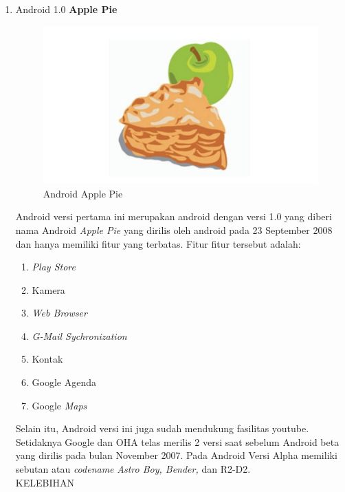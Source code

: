 \begin{enumerate}

\item Android 1.0 \textbf{Apple Pie}\\
\begin{figure}[!htbp]
    \centering
    \includegraphics[scale = 0.3]{pictures/android-apple-pie.jpg}
    \caption{Android Apple Pie}
    \label{}
\end{figure}

Android versi pertama ini merupakan android dengan versi 1.0 yang diberi nama Android \textit{Apple Pie} yang dirilis oleh android  pada 23 September 2008 dan hanya memiliki fitur yang terbatas. Fitur fitur tersebut adalah:

\begin{enumerate}
    \item \textit{Play Store}
    \item Kamera
    \item \textit{Web Browser}
    \item \textit{G-Mail Sychronization}
    \item Kontak
    \item Google Agenda
    \item Google \textit{Maps}
\end{enumerate}
Selain itu, Android versi ini juga sudah mendukung fasilitas youtube. Setidaknya Google dan OHA telas merilis 2 versi saat sebelum Android beta yang dirilis pada bulan November 2007. Pada Android Versi Alpha memiliki sebutan atau \textit{codename} \textit{Astro Boy, Bender,} dan R2-D2.\\

KELEBIHAN
\begin{enumerate}


\end{enumerate}
\end{enumerate}
